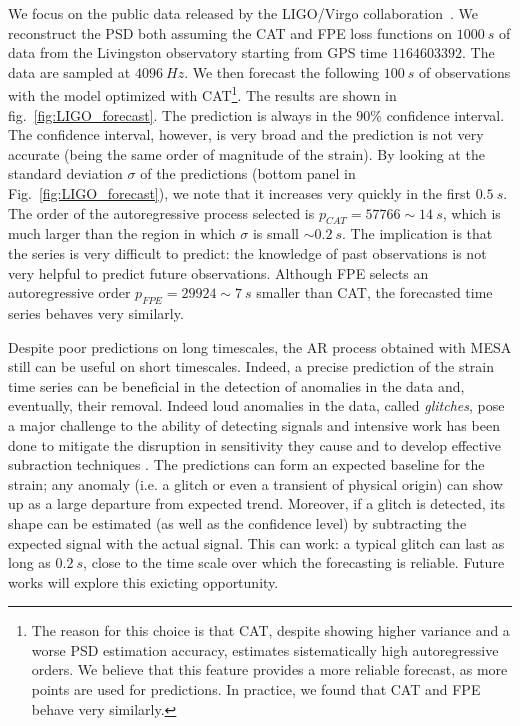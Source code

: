 \documentclass{aa}
\begin{document}
We focus on the public data released by the LIGO/Virgo collaboration~\citep{Abbott_2021}.
We reconstruct the PSD both assuming the CAT and FPE loss functions on $\SI{1000}{s}$ of data from the Livingston observatory
starting from GPS time $1164603392$. The data are sampled at $\SI{4096}{Hz}$.
We then forecast the following $\SI{100}{s}$ of observations with the model optimized with CAT\footnote{
The reason for this choice is that CAT, despite showing higher variance and a worse PSD estimation accuracy, estimates sistematically high autoregressive orders. We believe that this feature provides a more reliable forecast, as more points are used for predictions. In practice, we found that CAT and FPE behave very similarly.}. The results are shown in fig.~\ref{fig:LIGO_forecast}.
The prediction is always in the $90\%$ confidence interval. The confidence interval, however, is very broad and the prediction is not very accurate (being the same order of magnitude of the strain).
By looking at the standard deviation $\sigma$ of the predictions (bottom panel in Fig.~\ref{fig:LIGO_forecast}), we note that it increases very quickly in the first $\SI{0.5}{s}$.
The order of the autoregressive process selected is $p_{CAT} = 57766 \sim \SI{14}{s}$, which is much larger than the region in which $\sigma$ is small $\sim \SI{0.2}{s}$. The implication is that the series is very difficult to predict: the knowledge of past observations is not very helpful to predict future observations. Although FPE selects an autoregressive order $p_{FPE} = 29924 \sim \SI{7}{s}$ smaller than CAT,  the forecasted time series behaves very similarly.

Despite poor predictions on long timescales, the AR process obtained with MESA still can be useful on short timescales. Indeed, a precise prediction of the strain time series can be beneficial in the detection of anomalies in the data and, eventually, their removal. Indeed loud anomalies in the data, called {\it glitches}, pose a major challenge to the ability of detecting signals and intensive work has been done to mitigate the disruption in sensitivity they cause \citep{Nuttall_2015, Noise_char_2016, Zevin_2017} and to develop effective subraction techniques \citep{Pankow_2018, zackay2019detecting}.
The predictions can form an expected baseline for the strain; any anomaly (i.e. a glitch or even a transient of physical origin) can show up as a large departure from expected trend.
Moreover, if a glitch is detected, its shape can be estimated (as well as the confidence level) by subtracting the expected signal with the actual signal.
This can work: a typical glitch can last as long as $\SI{0.2}{s}$, close to the time scale over which the forecasting is reliable. Future works will explore this exicting opportunity.
\end{document}
